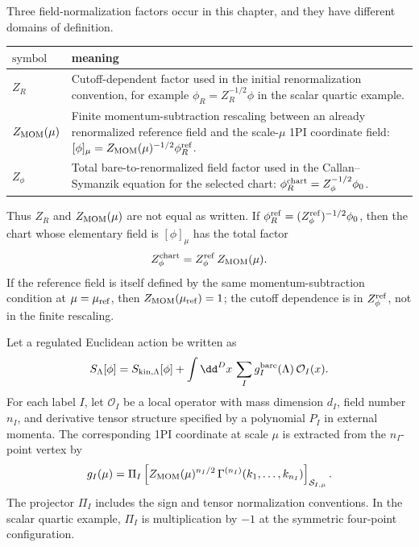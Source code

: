 \begin{definition}
\label{def:three-field-normalization-factors}
Three field-normalization factors occur in this chapter, and they have
different domains of definition.
\begin{center}
\begin{tabular}{p{}p{}}
\(\text{symbol}\) & meaning \\
\hline
\(Z_R\) &
Cutoff-dependent factor used in the initial renormalization convention, for
example \(\phi_R=Z_R^{-1/2}\phi\) in the scalar quartic example. \\
\(Z_{\rm MOM}(\mu)\) &
Finite momentum-subtraction rescaling between an already renormalized reference
field and the scale-\(\mu\) 1PI coordinate field:
\([\phi]_\mu=Z_{\rm MOM}(\mu)^{-1/2}\phi_R^{\rm ref}\). \\
\(Z_\phi\) &
Total bare-to-renormalized field factor used in the Callan--Symanzik equation
for the selected chart:
\(\phi_R^{\rm chart}=Z_\phi^{-1/2}\phi_0\).
\end{tabular}
\end{center}
Thus \(Z_R\) and \(Z_{\rm MOM}(\mu)\) are not equal as written.  If
\(\phi_R^{\rm ref}=(Z_\phi^{\rm ref})^{-1/2}\phi_0\), then the chart whose
elementary field is \([\phi]_\mu\) has the total factor
\[
  Z_\phi^{\rm chart}
  =
  Z_\phi^{\rm ref}\,Z_{\rm MOM}(\mu).
\]
If the reference field is itself defined by the same momentum-subtraction
condition at \(\mu=\mu_{\rm ref}\), then \(Z_{\rm MOM}(\mu_{\rm ref})=1\); the
cutoff dependence is in \(Z_\phi^{\rm ref}\), not in the finite rescaling.
\end{definition}

Let a regulated Euclidean action be written as
\[
  S_\Lambda[\phi]
  =
  S_{\rm kin,\Lambda}[\phi]
  +
  \int \dd^Dx\,\sum_I g_I^{\rm bare}(\Lambda)\,\mathcal O_I(x).
\]
For each label \(I\), let \(\mathcal O_I\) be a local operator with mass
dimension \(d_I\), field number \(n_I\), and derivative tensor structure
specified by a polynomial \(P_I\) in external momenta.  The corresponding 1PI
coordinate at scale \(\mu\) is extracted from the \(n_I\)-point vertex by
\[
  g_I(\mu)
  =
  \Pi_I
  \left[
    Z_{\rm MOM}(\mu)^{n_I/2}\,
    \Gamma^{(n_I)}(k_1,\ldots,k_{n_I})
  \right]_{\mathcal S_{I,\mu}} .
\]
The projector \(\Pi_I\) includes the sign and tensor normalization
conventions.  In the scalar quartic example, \(\Pi_I\) is multiplication by
\(-1\) at the symmetric four-point configuration.

